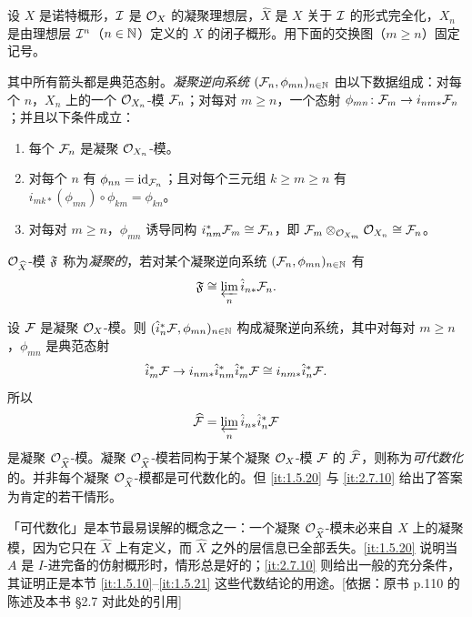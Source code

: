 设 $X$ 是诺特概形，$\mathcal{I}$ 是 $\mathcal{O}_X$ 的凝聚理想层，$\widehat X$ 是 $X$ 关于 $\mathcal{I}$ 的形式完全化，$X_n$ 是由理想层 $\mathcal{I}^n$（$n\in\mathbb{N}$）定义的 $X$ 的闭子概形。用下面的交换图（$m\ge n$）固定记号。
\begin{center}
\end{center}
其中所有箭头都是典范态射。\emph{凝聚逆向系统} $(\mathcal{F}_n,\phi_{mn})_{n\in\mathbb{N}}$ 由以下数据组成：对每个 $n$，$X_n$ 上的一个 $\mathcal{O}_{X_n}$-模 $\mathcal{F}_n$；对每对 $m\ge n$，一个态射 $\phi_{mn}\colon\mathcal{F}_m\to i_{nm*}\mathcal{F}_n$；并且以下条件成立：
\begin{enumerate}[label=(\alph*),leftmargin=2.8em]
  \item 每个 $\mathcal{F}_n$ 是凝聚 $\mathcal{O}_{X_n}$-模。
  \item 对每个 $n$ 有 $\phi_{nn}=\operatorname{id}_{\mathcal{F}_n}$；且对每个三元组 $k\ge m\ge n$ 有 $i_{mk*}(\phi_{mn})\circ\phi_{km}=\phi_{kn}$。
  \item 对每对 $m\ge n$，$\phi_{mn}$ 诱导同构 $i_{nm}^*\mathcal{F}_m\cong\mathcal{F}_n$，即 $\mathcal{F}_m\otimes_{\mathcal{O}_{X_m}}\mathcal{O}_{X_n}\cong\mathcal{F}_n$。
\end{enumerate}

$\mathcal{O}_{\widehat X}$-模 $\mathfrak{F}$ 称为\emph{凝聚的}，若对某个凝聚逆向系统 $(\mathcal{F}_n,\phi_{mn})_{n\in\mathbb{N}}$ 有
\[
\mathfrak{F}\cong\varprojlim_n\hat i_{n*}\mathcal{F}_n.
\]

设 $\mathcal{F}$ 是凝聚 $\mathcal{O}_X$-模。则 $(\hat i_n^*\mathcal{F},\phi_{mn})_{n\in\mathbb{N}}$ 构成凝聚逆向系统，其中对每对 $m\ge n$，$\phi_{mn}$ 是典范态射
\[
\hat i_m^*\mathcal{F}\to i_{nm*}\hat i_{nm}^*\hat i_m^*\mathcal{F}\cong i_{nm*}\hat i_n^*\mathcal{F}.
\]
所以
\[
\widehat{\mathcal{F}}=\varprojlim_n\hat i_{n*}\hat i_n^*\mathcal{F}
\]
是凝聚 $\mathcal{O}_{\widehat X}$-模。凝聚 $\mathcal{O}_{\widehat X}$-模若同构于某个凝聚 $\mathcal{O}_X$-模 $\mathcal{F}$ 的 $\widehat{\mathcal{F}}$，则称为\emph{可代数化}的。并非每个凝聚 $\mathcal{O}_{\widehat X}$-模都是可代数化的。但 \ref{it:1.5.20} 与 \ref{it:2.7.10} 给出了答案为肯定的若干情形。
\begin{tnote}
「可代数化」是本节最易误解的概念之一：一个凝聚 $\mathcal{O}_{\widehat X}$-模未必来自 $X$ 上的凝聚模，因为它只在 $\widehat X$ 上有定义，而 $\widehat X$ 之外的层信息已全部丢失。\ref{it:1.5.20} 说明当 $A$ 是 $I$-进完备的仿射概形时，情形总是好的；\ref{it:2.7.10} 则给出一般的充分条件，其证明正是本节 \ref{it:1.5.10}--\ref{it:1.5.21} 这些代数结论的用途。[依据：原书 p.110 的陈述及本书 §2.7 对此处的引用]
\end{tnote}

